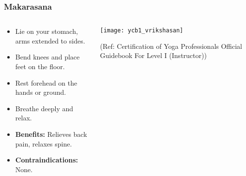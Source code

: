 \begin{frame}[fragile]\frametitle{Makarasana}
\begin{columns}
    \begin{column}[T]{0.5\linewidth}
      \begin{itemize}
        \item Lie on your stomach, arms extended to sides.
        \item Bend knees and place feet on the floor.
        \item Rest forehead on the hands or ground.
        \item Breathe deeply and relax.
        \item \textbf{Benefits:} Relieves back pain, relaxes spine.
        \item \textbf{Contraindications:} None.
      \end{itemize}
    \end{column}
    \begin{column}[T]{0.5\linewidth}
        \begin{center}
        \begin{center}
		        \texttt{[image: ycb1\_vrikshasan]}
				
				{\tiny (Ref: Certification  of Yoga Professionals Official Guidebook For Level I (Instructor))}	        
		\end{center}   
        \end{center}    
    \end{column}
  \end{columns}
\end{frame}

